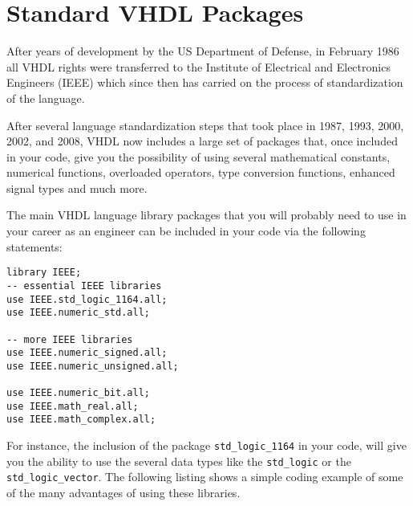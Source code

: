 
\chapter{Standard VHDL Packages}
After years of development by the US Department of Defense, in February 1986 all VHDL rights were transferred to the Institute of Electrical and Electronics Engineers (IEEE) which since then has carried on the process of standardization of the language.

After several language standardization steps that took place in 1987, 1993, 2000, 2002, and 2008, VHDL now includes a large set of packages that, once included in your code, give you the possibility of using several mathematical constants, numerical functions, overloaded operators, type conversion functions, enhanced signal types and much more.

The main VHDL language library packages that you will probably need to use in your career as an engineer can be included in your code via the following statements:

{\scriptsize
\begin{lstlisting}
library IEEE;
-- essential IEEE libraries
use IEEE.std_logic_1164.all;
use IEEE.numeric_std.all;

-- more IEEE libraries
use IEEE.numeric_signed.all;
use IEEE.numeric_unsigned.all;

use IEEE.numeric_bit.all;
use IEEE.math_real.all;
use IEEE.math_complex.all;
\end{lstlisting}
}

For instance, the inclusion of the package \texttt{std\_logic\_1164} in your code, will give you the ability to use the several data types like the \texttt{std\_logic} or the \texttt{std\_logic\_vector}. The following listing shows a simple coding example of some of the many advantages of using these libraries.


